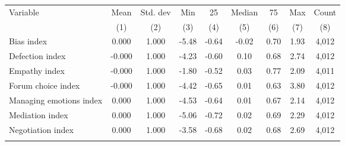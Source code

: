 \begin{tabular}{lcccccccc}
\hline \noalign{\smallskip}Variable & Mean & Std. dev & Min & 25 & Median & 75 & Max & Count\\
 & (1) & (2) & (3) & (4) & (5) & (6) & (7) & (8)\\
\noalign{\smallskip}\hline \noalign{\smallskip}Bias index & 0.000 & 1.000 & -5.48 & -0.64 & -0.02 & 0.70 & 1.93 & 4,012\\
Defection index & -0.000 & 1.000 & -4.23 & -0.60 & 0.10 & 0.68 & 2.74 & 4,012\\
Empathy index & -0.000 & 1.000 & -1.80 & -0.52 & 0.03 & 0.77 & 2.09 & 4,011\\
Forum choice index & -0.000 & 1.000 & -4.42 & -0.65 & 0.01 & 0.63 & 3.80 & 4,012\\
Managing emotions index & 0.000 & 1.000 & -4.53 & -0.64 & 0.01 & 0.67 & 2.14 & 4,012\\
Mediation index & 0.000 & 1.000 & -5.06 & -0.72 & 0.02 & 0.69 & 2.29 & 4,012\\
Negotiation index & 0.000 & 1.000 & -3.58 & -0.68 & 0.02 & 0.68 & 2.69 & 4,012\\
\noalign{\smallskip}\hline\end{tabular}
